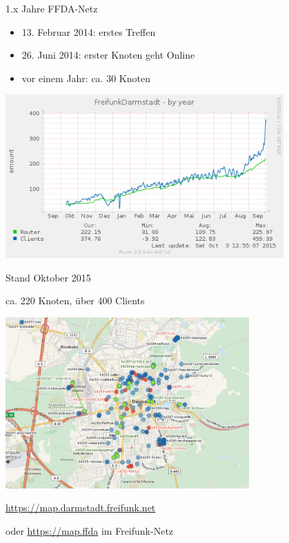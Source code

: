 \documentclass[handout, 10pt]{beamer}
\begin{document}



\begin{frame}{1.x Jahre FFDA-Netz}
	\vfill
	\begin{itemize}[<+->]
		\item 13. Februar 2014: erstes Treffen
		\item 26. Juni 2014: erster Knoten geht Online
		\item vor einem Jahr: ca. 30 Knoten
	\end{itemize}
	\pause
	\begin{center}
		\includegraphics[width=0.8\textwidth]{images/ffda-Okt14-15}
	\end{center}
\end{frame}

\begin{frame}{Stand Oktober 2015}
	\begin{center}
		\vfill
		ca. 220 Knoten, über 400 Clients
		\begin{center}
			\includegraphics[width=0.7\textwidth]{images/2015-10-03_darmstadt-map}
		\end{center}

		\vfill
		\url{https://map.darmstadt.freifunk.net}
		
		\tiny oder \url{https://map.ffda} im Freifunk-Netz
	\end{center}	
\end{frame}
\end{document}

